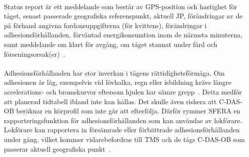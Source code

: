 \paragraph{}
\hspace{-14pt}
Status report är ett meddelande som består av GPS-position och hastighet för tåget, senast passerade geografiska referenspunkt, aktuell JP, förändringar av de på förhand angivna fordonsuppgifterna (för kvittens), förändringar i adhesionsförhållanden, förväntad energikonsumtion inom de närmsta minuterna, samt meddelande om klart för avgång, om tåget stannat under färd och förseningsorsak(er)~\cite{IRS90940}.
\paragraph{}
\hspace{-14pt}
Adhesionsförhållanden har stor inverkan i tågens rättidighetsförmåga.
Om adhesionen är låg, exempelvis vid lövhalka, regn eller isbildning krävs längre accelerations- och bromskurvor eftersom hjulen har sämre grepp~\cite{Sfera-adhesion-poster-2022}.
Detta medför att planerad tidtabell ibland inte kan hållas.
Det skulle även riskera att C-DAS-OB beräknar en körprofil som inte går att efterfölja.
Därför rymmer SFERA en rapporteringsfunktion för adhesionsförhållanden som kan användas av lokförare.
Lokförare kan rapportera in försämrade eller förbättrade adhesionsförhållanden under gång, vilket kommer vidarebefordras till TMS och de tågs C-DAS-OB som passerar aktuell geografiska punkt~\cite{Sfera-adhesion-poster-2022}.
